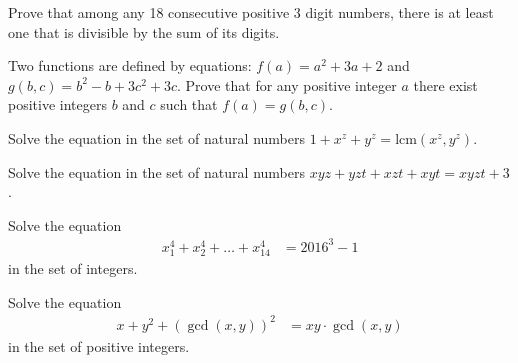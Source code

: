 \documentclass[problems.tex]{subfile}
\begin{document}
	
	
	
	
	\begin{problem}
		Prove that among any 18 consecutive positive $3$ digit numbers, there is at least one that is divisible by the sum of its digits. %
	\end{problem}
	
	
	
	
	\begin{problem}
		Two functions are defined by equations: $f(a) = a^2 + 3a + 2$ and $g(b, c) = b^2 - b + 3c^2 + 3c$. Prove that for any positive integer $a$ there exist positive integers $b$ and $c$ such that $f(a) = g(b, c)$. %
	\end{problem}
	
	
	
	
	
	\begin{problem}
		Solve the equation in the set of natural numbers $1+x^z + y^z = \text{lcm}(x^z,y^z)$. %
	\end{problem}
	
	
	
	\begin{problem}
		Solve the equation in the set of natural numbers $xyz+yzt+xzt+xyt = xyzt + 3$. %
	\end{problem}
	
	
	
	\begin{problem}
		Solve the equation
		\begin{align*}
			x_1^4 + x_2^4 + \dots + x_{14}^4 &= 2016^3 -1
		\end{align*}
		in the set of integers.
	\end{problem}
	
	
	
	\begin{problem}
		Solve the equation
		\begin{align*}
			x + y^2 + \left(\gcd(x,y)\right)^2 &= xy \cdot \gcd(x,y)
		\end{align*}
		in the set of positive integers.
	\end{problem}
	
\end{document}
